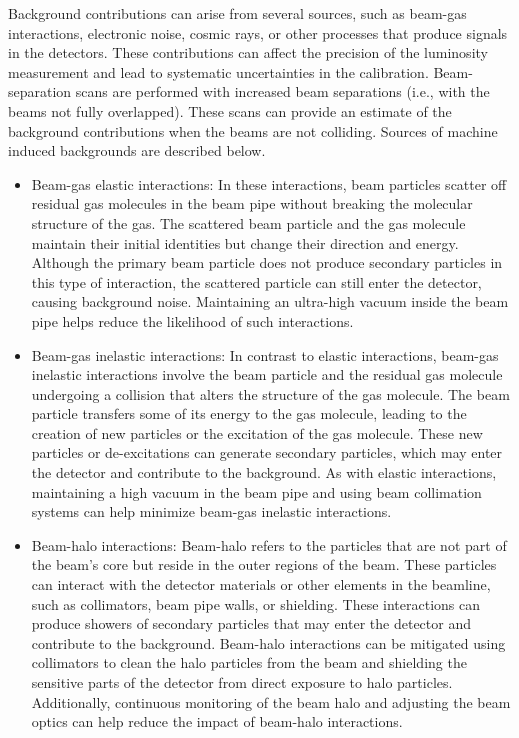 Background contributions can arise from several sources, such as beam-gas interactions, electronic noise, cosmic rays, or other processes that produce signals in the detectors. These contributions can affect the precision of the luminosity measurement and lead to systematic uncertainties in the calibration. Beam-separation scans are performed with increased beam separations (i.e., with the beams not fully overlapped). These scans can provide an estimate of the background contributions when the beams are not colliding. Sources of machine induced backgrounds are described below.

\begin{itemize}

\item Beam-gas elastic interactions: In these interactions, beam particles scatter off residual gas molecules in the beam pipe without breaking the molecular structure of the gas. The scattered beam particle and the gas molecule maintain their initial identities but change their direction and energy. Although the primary beam particle does not produce secondary particles in this type of interaction, the scattered particle can still enter the detector, causing background noise. Maintaining an ultra-high vacuum inside the beam pipe helps reduce the likelihood of such interactions.

\item Beam-gas inelastic interactions: In contrast to elastic interactions, beam-gas inelastic interactions involve the beam particle and the residual gas molecule undergoing a collision that alters the structure of the gas molecule. The beam particle transfers some of its energy to the gas molecule, leading to the creation of new particles or the excitation of the gas molecule. These new particles or de-excitations can generate secondary particles, which may enter the detector and contribute to the background. As with elastic interactions, maintaining a high vacuum in the beam pipe and using beam collimation systems can help minimize beam-gas inelastic interactions.

\item Beam-halo interactions: Beam-halo refers to the particles that are not part of the beam's core but reside in the outer regions of the beam. These particles can interact with the detector materials or other elements in the beamline, such as collimators, beam pipe walls, or shielding. These interactions can produce showers of secondary particles that may enter the detector and contribute to the background. Beam-halo interactions can be mitigated using collimators to clean the halo particles from the beam and shielding the sensitive parts of the detector from direct exposure to halo particles. Additionally, continuous monitoring of the beam halo and adjusting the beam optics can help reduce the impact of beam-halo interactions.

\end{itemize}


